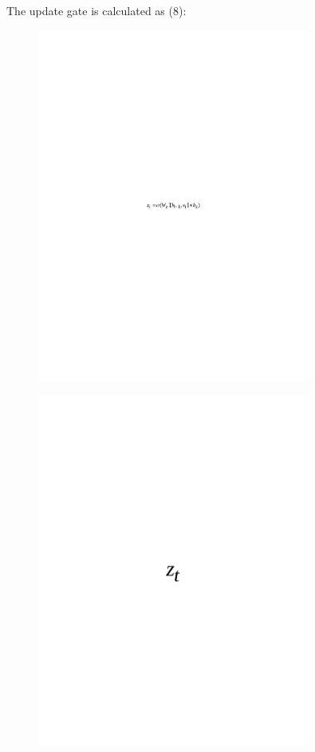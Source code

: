 The update gate is calculated as (8):

\begin{figure}[H]
	\centering
	\includegraphics[width=0.8\textwidth]{media/ict/image64}
	\caption*{}
\end{figure}

\begin{figure}[H]
	\centering
	\includegraphics[width=0.8\textwidth]{media/ict/image65}
	\caption*{}
\end{figure}

